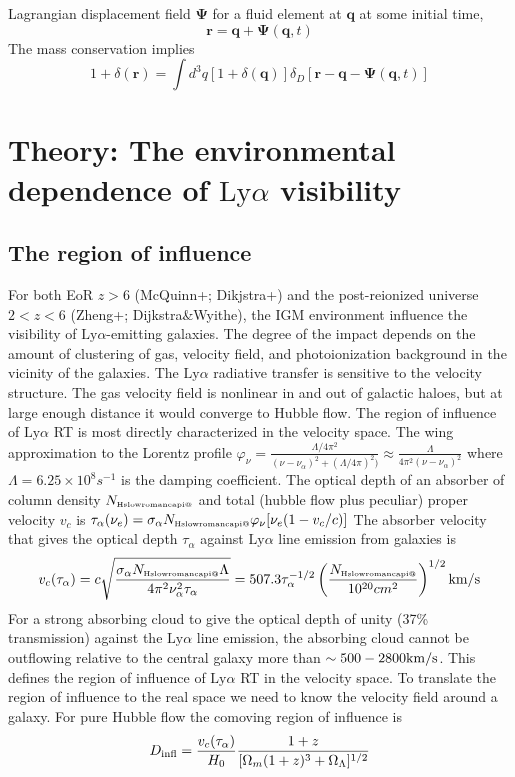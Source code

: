 \documentclass[useAMS,usenatbib,twocolumn]{mn2e}
\makeatletter
\newcommand{\Rmnum}[1]{\expandafter\@slowromancap\romannumeral #1@}
\newcommand{\LyA}{\mbox{Ly}\alpha}
\newcommand{\NHI}{N_{\mbox{\tiny H\Rmnum{1}}}}
\makeatother
\begin{document}
Lagrangian displacement field $\boldsymbol{\Psi}$ for a fluid element
at $\boldsymbol{q}$ at some initial time,
\begin{equation}
\boldsymbol{r}=\boldsymbol{q}+\boldsymbol{\Psi}(\boldsymbol{q},t)
\end{equation}
The mass conservation implies
\begin{equation}
1+\delta(\boldsymbol{r})=\int d^3q[1+\delta(\boldsymbol{q})]
\delta_D[\boldsymbol{r}-\boldsymbol{q}-\boldsymbol{\Psi}(\boldsymbol{q},t)]
\end{equation}


\section{Theory: The environmental dependence of $\LyA$ visibility}

\subsection{The region of influence}
For both EoR $z>6$ (McQuinn+; Dikjstra+) and the post-reionized universe 
$2<z<6$ (Zheng+; Dijkstra\&Wyithe), the IGM environment influence the
visibility of $\LyA$-emitting galaxies. The degree of the impact depends
on the amount of clustering of gas, velocity field, and photoionization
background in the vicinity of the galaxies. The $\LyA$ radiative transfer
is sensitive to the velocity structure. The gas velocity field is nonlinear
in and out of galactic haloes, but at large enough distance it would 
converge to Hubble flow. The region of influence of $\LyA$ RT is most 
directly characterized in the velocity space. The wing approximation to
the Lorentz profile $\varphi_\nu=\frac{\Lambda/4\pi^2}{(\nu-\nu_\alpha)^2+(\Lambda/4\pi)^2)}
\approx\frac{\Lambda}{4\pi^2(\nu-\nu_\alpha)^2}$ where $\Lambda=6.25\times10^8s^{-1}$ is
the damping coefficient.  The optical depth of 
an absorber of column density $\NHI$ and total (hubble flow plus peculiar)
proper velocity $v_c$ is $\tau_\alpha(\nu_e)=\sigma_\alpha\NHI\varphi_\nu[\nu_e(1-v_c/c)]$
The absorber velocity that gives the optical depth $\tau_\alpha$
against $\LyA$ line emission from galaxies is 
\begin{equation}
v_c(\tau_\alpha)=c\sqrt{\frac{\sigma_\alpha\NHI\Lambda}{4\pi^2\nu_\alpha^2\tau_\alpha}}
=507.3\tau_\alpha^{-1/2}\left(\frac{\NHI}{10^{20}cm^2}\right)^{1/2}\rm{km/s}
\end{equation}
For a strong absorbing cloud to give the optical depth of unity (37\% transmission) 
against the $\LyA$ line emission, the absorbing cloud cannot be 
outflowing relative to the central galaxy more than $\sim500-2800\rm{km/s}$.
This defines the region of influence of $\LyA$ RT in the velocity space.
To translate the region of influence to the real space we need to know the
velocity field around a galaxy. For pure Hubble flow the comoving region of influence
is 
\begin{equation}
D_{\rm{infl}}=\frac{v_c(\tau_\alpha)}{H_0}\frac{1+z}{[\Omega_m(1+z)^3+\Omega_\Lambda]^{1/2}}
\end{equation}
\end{document}
